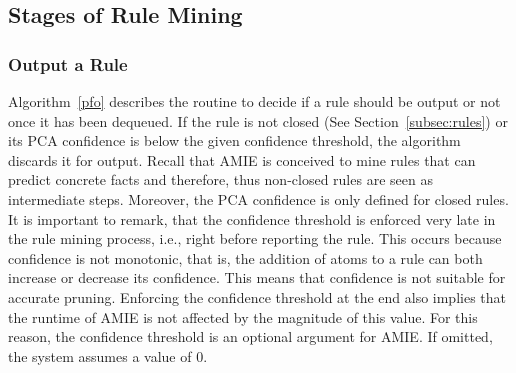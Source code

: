 


\subsection{Stages of Rule Mining}

\subsubsection{Output a Rule}  
\label{subsubsec:whenToOutput}
Algorithm~\ref{pfo} describes the routine to decide if a rule should be output or 
not once it has been dequeued. If the rule is not closed (See Section~\ref{subsec:rules}) or 
its PCA confidence is below the given confidence threshold, the algorithm discards it for output. 
Recall that AMIE is conceived to mine rules that can predict concrete facts and therefore, thus non-closed rules are
seen as intermediate steps. Moreover, the PCA confidence is only defined for closed rules.
It is important to remark, that the confidence threshold is enforced 
very late in the rule mining process, i.e., right before reporting the rule. 
This occurs because confidence is not monotonic, that is, the addition of atoms to a rule
can both increase or decrease its confidence. This means that confidence is not suitable for accurate
pruning. Enforcing the confidence threshold at the end also implies that
the runtime of AMIE is not affected by the magnitude of this value. For this reason, 
the confidence threshold is an optional argument for AMIE. If omitted, the system assumes a value of 0. 

